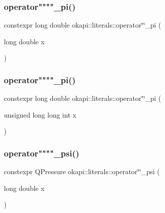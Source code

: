 \mbox{\label{namespaceokapi_1_1literals_a40698358b7eaa4c223ff8b0076249f4e}} 
\subsubsection{\texorpdfstring{operator""""\_pi()}{operator""\_pi()}\hspace{0.1cm}{\footnotesize\ttfamily [1/2]}}
{\footnotesize\ttfamily constexpr long double okapi\+::literals\+::operator\char`\"{}\char`\"{}\+\_\+pi (\begin{DoxyParamCaption}\item[{long double}]{x }\end{DoxyParamCaption})}

\mbox{\label{namespaceokapi_1_1literals_a32a563b32efa7e39480f90e5b9db8e6a}} 
\subsubsection{\texorpdfstring{operator""""\_pi()}{operator""\_pi()}\hspace{0.1cm}{\footnotesize\ttfamily [2/2]}}
{\footnotesize\ttfamily constexpr long double okapi\+::literals\+::operator\char`\"{}\char`\"{}\+\_\+pi (\begin{DoxyParamCaption}\item[{unsigned long long int}]{x }\end{DoxyParamCaption})}

\mbox{\label{namespaceokapi_1_1literals_a1f9c5bdd623f5eaf85c0976284c19ff5}} 
\subsubsection{\texorpdfstring{operator""""\_psi()}{operator""\_psi()}\hspace{0.1cm}{\footnotesize\ttfamily [1/2]}}
{\footnotesize\ttfamily constexpr Q\+Pressure okapi\+::literals\+::operator\char`\"{}\char`\"{}\+\_\+psi (\begin{DoxyParamCaption}\item[{long double}]{x }\end{DoxyParamCaption})}

